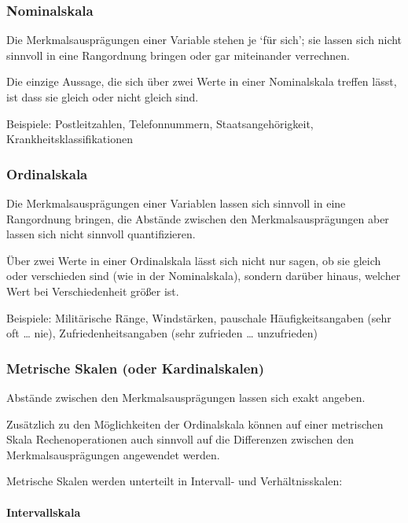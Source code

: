 \documentclass[
  11pt,
  ngerman,
  a4paper,
]{report}
\begin{document}
\hypertarget{nominalskala}{%
\subsubsection{Nominalskala}\label{nominalskala}}

Die Merkmalsausprägungen einer Variable stehen je \enquote*{für sich}; sie lassen sich nicht sinnvoll in eine Rangordnung bringen oder gar miteinander verrechnen.

Die einzige Aussage, die sich über zwei Werte in einer Nominalskala treffen lässt, ist dass sie gleich oder nicht gleich sind.

Beispiele: Postleitzahlen, Telefonnummern, Staatsangehörigkeit, Krankheitsklassifikationen

\hypertarget{ordinalskala}{%
\subsubsection{Ordinalskala}\label{ordinalskala}}

Die Merkmalsausprägungen einer Variablen lassen sich sinnvoll in eine Rangordnung bringen, die Abstände zwischen den Merkmalsausprägungen aber lassen sich nicht sinnvoll quantifizieren.

Über zwei Werte in einer Ordinalskala lässt sich nicht nur sagen, ob sie gleich oder verschieden sind (wie in der Nominalskala), sondern darüber hinaus, welcher Wert bei Verschiedenheit größer ist.

Beispiele: Militärische Ränge, Windstärken, pauschale Häufigkeitsangaben (sehr oft \ldots{} nie), Zufriedenheitsangaben (sehr zufrieden \ldots{} unzufrieden)

\hypertarget{metrische-skalen-oder-kardinalskalen}{%
\subsubsection{Metrische Skalen (oder Kardinalskalen)}\label{metrische-skalen-oder-kardinalskalen}}

Abstände zwischen den Merkmalsausprägungen lassen sich exakt angeben.

Zusätzlich zu den Möglichkeiten der Ordinalskala können auf einer metrischen Skala Rechenoperationen auch sinnvoll auf die Differenzen zwischen den Merkmalsausprägungen angewendet werden.

Metrische Skalen werden unterteilt in Intervall- und Verhältnisskalen:

\hypertarget{intervallskala}{%
\paragraph{Intervallskala}\label{intervallskala}}
\end{document}
